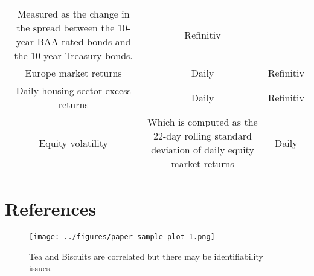 \documentclass[
  10pt,
]{article}
\begin{document}
\begin{longtable}[]{@{}ccc@{}}
\begin{minipage}[t]{0.32\columnwidth}
Measured as the change in the spread between the 10-year BAA rated bonds
and the 10-year Treasury bonds.\strut
\end{minipage} & \begin{minipage}[t]{0.24\columnwidth}\centering
Refinitiv\strut
\end{minipage}\tabularnewline
\begin{minipage}[t]{0.36\columnwidth}\centering
Europe market returns\strut
\end{minipage} & \begin{minipage}[t]{0.32\columnwidth}\centering
Daily\strut
\end{minipage} & \begin{minipage}[t]{0.24\columnwidth}\centering
Refinitiv\strut
\end{minipage}\tabularnewline
\begin{minipage}[t]{0.36\columnwidth}\centering
Daily housing sector excess returns\strut
\end{minipage} & \begin{minipage}[t]{0.32\columnwidth}\centering
Daily\strut
\end{minipage} & \begin{minipage}[t]{0.24\columnwidth}\centering
Refinitiv\strut
\end{minipage}\tabularnewline
\begin{minipage}[t]{0.36\columnwidth}\centering
Equity volatility\strut
\end{minipage} & \begin{minipage}[t]{0.32\columnwidth}\centering
Which is computed as the 22-day rolling standard deviation of daily
equity market returns\strut
\end{minipage} & \begin{minipage}[t]{0.24\columnwidth}\centering
Daily\strut
\end{minipage}\tabularnewline
\bottomrule
\end{longtable}

\hypertarget{references}{%
\section{References}\label{references}}

\begin{figure}
\centering
\texttt{[image: ../figures/paper-sample-plot-1.png]}
\caption{Tea and Biscuits are correlated but there may be
identifiability issues.}
\end{figure}
\end{document}
